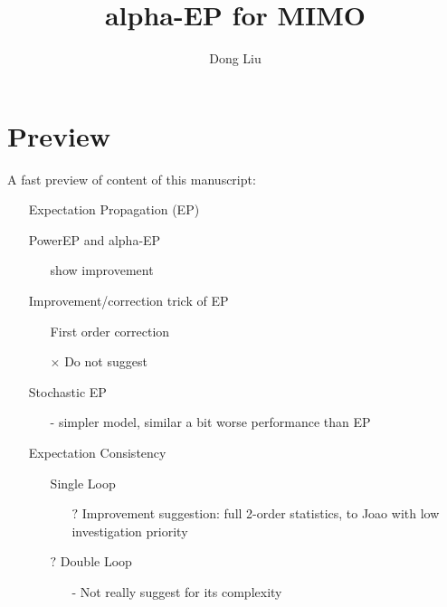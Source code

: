 \documentclass{article}
\author{Dong Liu}
\title{alpha-EP for MIMO}
\begin{document}
\maketitle
\tableofcontents


\section{Preview}
A fast preview of content of this manuscript:
\begin{itemize}
\item[\checkmark] Expectation Propagation (EP)
\item[\checkmark] PowerEP and alpha-EP
  \begin{itemize}
  \item[\checkmark] show improvement
  \end{itemize}
\item[\checkmark] Improvement/correction trick of EP
  \begin{itemize}
  \item[\checkmark] First order correction
  \item[$\times$] Do not suggest
  \end{itemize}
  
\item[\checkmark] Stochastic EP
  \begin{itemize}
  \item[-] simpler model, similar a bit worse performance than EP
  \end{itemize}
\item[\checkmark] Expectation Consistency
  
  \begin{itemize}
  \item[\checkmark] Single Loop
    \begin{itemize}
    \item[$?$] Improvement suggestion: full 2-order statistics, to Joao with low investigation priority
    \end{itemize}
    
  \item[$?$] Double Loop
    \begin{itemize}
    \item[-] Not really suggest for its complexity
    \end{itemize}
    
  \end{itemize}
  
  
\end{itemize}
\end{document}
